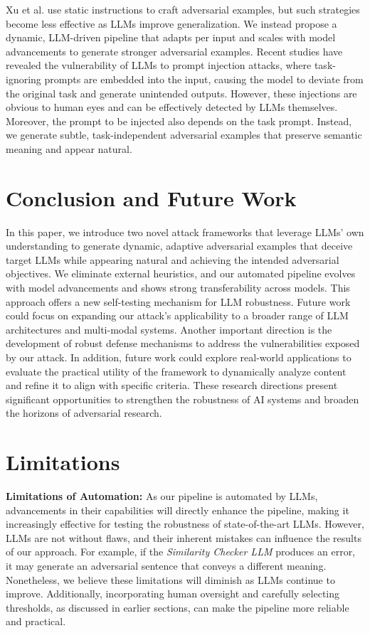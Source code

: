 \documentclass[11pt]{article}
\begin{document}
Xu et al. \cite{xu2023llmfoolitselfpromptbased} use static instructions to craft adversarial examples, but such strategies become less effective as LLMs improve generalization. We instead propose a dynamic, LLM-driven pipeline that adapts per input and scales with model advancements to generate stronger adversarial examples.
 Recent studies \cite{299563, Branch2022EvaluatingTS, Perez2022IgnorePP} have revealed the vulnerability of LLMs to prompt injection attacks, where task-ignoring prompts are embedded into the input, causing the model to deviate from the original task and generate unintended outputs. However, these injections are obvious to human eyes and can be effectively detected by LLMs \cite{299563} themselves. Moreover, the prompt to be injected also depends on the task prompt. Instead, we generate subtle, task-independent adversarial examples that preserve semantic meaning and appear natural.




\section{Conclusion and Future Work}

In this paper, we introduce two novel attack frameworks that leverage LLMs’ own understanding to generate dynamic, adaptive adversarial examples that deceive target LLMs while appearing natural and achieving the intended adversarial objectives. We eliminate external heuristics, and our automated pipeline evolves with model advancements and shows strong transferability across models. This approach offers a new self-testing mechanism for LLM robustness. Future work could focus on expanding our attack's applicability to a broader range of LLM architectures and multi-modal systems. Another important direction is the development of robust defense mechanisms to address the vulnerabilities exposed by our attack. In addition, future work could explore real-world applications to evaluate the practical utility of the framework to dynamically analyze content and refine it to align with specific criteria. These research directions present significant opportunities to strengthen the robustness of AI systems and broaden the horizons of adversarial research.

\section*{Limitations}
\label{sec:discussion-limitation}
\textbf{Limitations of Automation:} As our pipeline is automated by LLMs, advancements in their capabilities will directly enhance the pipeline, making it increasingly effective for testing the robustness of state-of-the-art LLMs. However, LLMs are not without flaws, and their inherent mistakes can influence the results of our approach. For example, if the \textsl{Similarity Checker LLM} produces an error, it may generate an adversarial sentence that conveys a different meaning. Nonetheless, we believe these limitations will diminish as LLMs continue to improve. Additionally, incorporating human oversight and carefully selecting thresholds, as discussed in earlier sections, can make the pipeline more reliable and practical.
\end{document}
